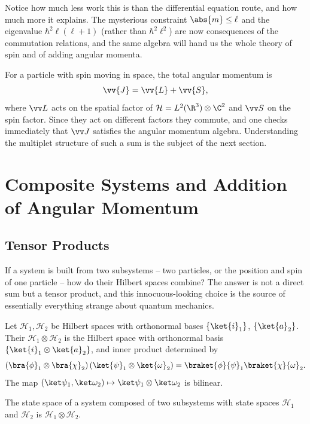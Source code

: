 \begin{remark}
    Notice how much less work this is than the differential equation route, and how much more it explains. The mysterious constraint $\abs{m}\leq\ell$ and the eigenvalue $\hbar^2\ell(\ell+1)$ (rather than $\hbar^2\ell^2$) are now consequences of the commutation relations, and the same algebra will hand us the whole theory of spin and of adding angular momenta.
\end{remark}

For a particle with spin moving in space, the total angular momentum is
$$
\vv{J} = \vv{L} + \vv{S},
$$
where $\vv L$ acts on the spatial factor of $\mathcal{H} = L^2(\R^3)\otimes\C^2$ and $\vv S$ on the spin factor. Since they act on different factors they commute, and one checks immediately that $\vv J$ satisfies the angular momentum algebra. Understanding the multiplet structure of such a sum is the subject of the next section.

\section{Composite Systems and Addition of Angular Momentum}

\subsection{Tensor Products}\label{sec:tensor}

If a system is built from two subsystems -- two particles, or the position and spin of one particle -- how do their Hilbert spaces combine? The answer is not a direct sum but a tensor product, and this innocuous-looking choice is the source of essentially everything strange about quantum mechanics.

\begin{definition}
    Let $\mathcal{H}_1, \mathcal{H}_2$ be Hilbert spaces with orthonormal bases $\{\ket{i}_1\}$, $\{\ket{a}_2\}$. Their  $\mathcal{H}_1 \otimes \mathcal{H}_2$ is the Hilbert space with orthonormal basis $\{\ket{i}_1 \otimes \ket{a}_2\}$, and inner product determined by
    $$
    \left( \bra{\phi}_1\otimes\bra{\chi}_2 \right)\left( \ket{\psi}_1\otimes\ket{\omega}_2 \right) = \braket{\phi}{\psi}_1 \braket{\chi}{\omega}_2.
    $$
    The map $(\ket\psi_1, \ket\omega_2) \mapsto \ket\psi_1\otimes\ket\omega_2$ is bilinear.
\end{definition}

\begin{axiom}
    The state space of a system composed of two subsystems with state spaces $\mathcal{H}_1$ and $\mathcal{H}_2$ is $\mathcal{H}_1 \otimes \mathcal{H}_2$.
\end{axiom}

